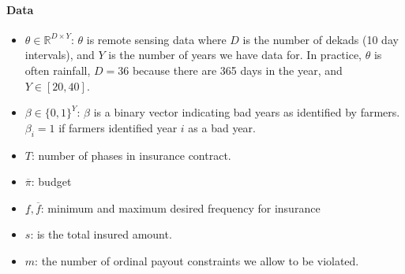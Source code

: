 \documentclass[11pt]{article}
\begin{document}
    \paragraph{Data}
      \begin{itemize}
        \item $\theta \in \mathbb{R}^{D \times Y}$: $\theta$ is remote sensing data where $D$ is the number of dekads (10 day intervals), and $Y$ is the number of years we have data for. In practice, $\theta$ is often rainfall, $D=36$ because there are 365 days in the year, and $Y\in [20,40]$.
        \item $\beta \in \{ 0,1\}^Y$: $\beta$ is a binary vector indicating bad years as identified by farmers. $\beta_i = 1$ if farmers identified year $i$ as a bad year. 
        \item $T$: number of phases in insurance contract. 
        \item $\overline{\pi}$: budget 
        \item $\underline{f}, \overline{f}$: minimum and maximum desired frequency for insurance
        \item $s$: is the total insured amount. 
        \item $m$: the number of ordinal payout constraints we allow to be violated. 
      \end{itemize}
\end{document}
